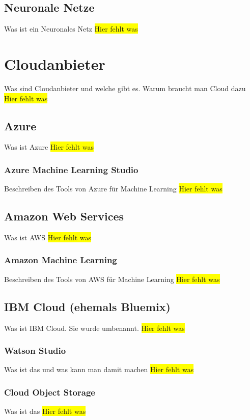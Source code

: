 \subsection{Neuronale Netze}
Was ist ein Neuronales Netz
\colorbox{yellow}{Hier fehlt was}

\section{Cloudanbieter}
Was sind Cloudanbieter und welche gibt es. Warum braucht man Cloud dazu
\colorbox{yellow}{Hier fehlt was}

\subsection{Azure}
Was ist Azure
\colorbox{yellow}{Hier fehlt was}

\subsubsection{Azure Machine Learning Studio}
Beschreiben des Tools von Azure für Machine Learning
\colorbox{yellow}{Hier fehlt was}

\subsection{Amazon Web Services}
Was ist AWS
\colorbox{yellow}{Hier fehlt was}

\subsubsection{Amazon Machine Learning}
Beschreiben des Tools von AWS für Machine Learning
\colorbox{yellow}{Hier fehlt was}

\subsection{IBM Cloud (ehemals Bluemix)}
Was ist IBM Cloud. Sie wurde umbenannt.
\colorbox{yellow}{Hier fehlt was}

\subsubsection{Watson Studio}
Was ist das und was kann man damit machen
\colorbox{yellow}{Hier fehlt was}

\subsubsection{Cloud Object Storage}
Was ist das
\colorbox{yellow}{Hier fehlt was}

